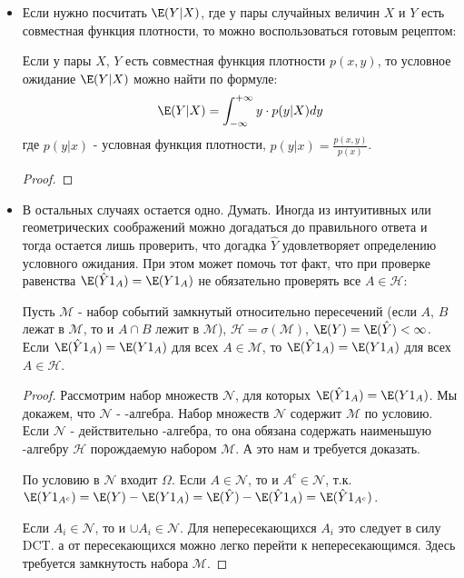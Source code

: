 {\begin{itemize}
\item Если нужно посчитать $\E(Y|X)$, где у пары случайных величин $X$ и $Y$ есть совместная функция плотности, то можно воспользоваться готовым рецептом:
\begin{myth}
Если у пары $X$, $Y$ есть совместная функция плотности $p(x,y)$, то условное ожидание $\E(Y|X)$ можно найти по формуле:
\begin{equation}
\E(Y|X)=\int_{-\infty}^{+\infty}y\cdot p(y|X)dy
\end{equation}
где $p(y|x)$ - условная функция плотности, $p(y|x)=\frac{p(x,y)}{p(x)}$. 
\end{myth}
\begin{proof}

\end{proof}

\item В остальных случаях остается одно. Думать. Иногда из интуитивных или геометрических соображений можно догадаться до правильного ответа и тогда остается лишь проверить, что догадка $\hat{Y}$ удовлетворяет определению условного ожидания. При этом может помочь тот факт, что при проверке равенства $\E(\hat{Y}1_{A})=\E(Y1_{A})$ не обязательно проверять все $A\in\mathcal{H}$:
\begin{myth}
Пусть $\mathcal{M}$ - набор событий замкнутый относительно пересечений (если $A$, $B$ лежат в $\mathcal{M}$, то и $A\cap B$ лежит в $\mathcal{M}$), $\mathcal{H}=\sigma(\mathcal{M})$, $\E(Y)=\E(\hat{Y})<\infty$. Если $\E(\hat{Y}1_{A})=\E(Y1_{A})$ для всех $A\in\mathcal{M}$, то $\E(\hat{Y}1_{A})=\E(Y1_{A})$ для всех $A\in\mathcal{H}$.
\end{myth}
\begin{proof}
Рассмотрим набор множеств $\mathcal{N}$, для которых $\E(\hat{Y}1_{A})=\E(Y1_{A})$. Мы докажем, что $\mathcal{N}$ - \s-алгебра. Набор множеств $\mathcal{N}$ содержит $\mathcal{M}$ по условию. Если $\mathcal{N}$ - действительно \s-алгебра, то она обязана содержать наименьшую \s-алгебру $\mathcal{H}$ порождаемую набором $\mathcal{M}$. А это нам и требуется доказать.

По условию в $\mathcal{N}$ входит $\Omega$. Если $A\in\mathcal{N}$, то и $A^{c}\in\mathcal{N}$, т.к. $\E(Y1_{A^{c}})=\E(Y)-\E(Y1_{A})=\E(\hat{Y})-\E(\hat{Y}1_{A})=\E(\hat{Y}1_{A^{c}})$. 

Если $A_{i}\in\mathcal{N}$, то и $\cup A_{i}\in\mathcal{N}$. Для непересекающихся $A_{i}$ это следует в силу DCT. а от пересекающихся можно легко перейти к непересекающимся. Здесь требуется замкнутость набора $\mathcal{M}$.
\end{proof}


\end{itemize}}
